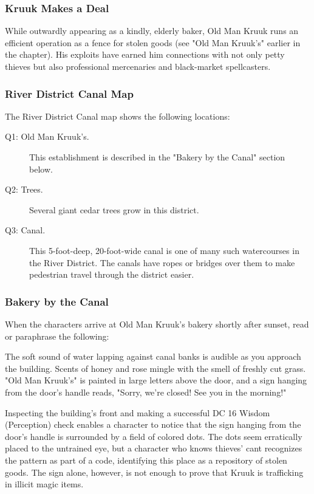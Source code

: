 \documentclass[a4paper, 11pt, bg=full, twocolumn, nooutline]{dndbook}
\begin{document}
\subsubsection{Kruuk Makes a Deal}

While outwardly appearing as a kindly, elderly baker, Old Man Kruuk runs an efficient operation as a fence for stolen goods (see "Old Man Kruuk's" earlier in the chapter). His exploits have earned him connections with not only petty thieves but also professional mercenaries and black-market spellcasters.

\subsubsection{River District Canal Map}

The River District Canal map shows the following locations:

\begin{description}
\item[Q1: Old Man Kruuk's.] This establishment is described in the "Bakery by the Canal" section below.
\item[Q2: Trees.] Several giant cedar trees grow in this district.
\item[Q3: Canal.] This 5-foot-deep, 20-foot-wide canal is one of many such watercourses in the River District. The canals have ropes or bridges over them to make pedestrian travel through the district easier.
\end{description}



\subsubsection{Bakery by the Canal}

When the characters arrive at Old Man Kruuk's bakery shortly after sunset, read or paraphrase the following:

\begin{DndReadAloud}
The soft sound of water lapping against canal banks is audible as you approach the building. Scents of honey and rose mingle with the smell of freshly cut grass. "Old Man Kruuk's" is painted in large letters above the door, and a sign hanging from the door's handle reads, "Sorry, we're closed! See you in the morning!"
\end{DndReadAloud}

Inspecting the building's front and making a successful DC 16 Wisdom (Perception) check enables a character to notice that the sign hanging from the door's handle is surrounded by a field of colored dots. The dots seem erratically placed to the untrained eye, but a character who knows thieves' cant recognizes the pattern as part of a code, identifying this place as a repository of stolen goods. The sign alone, however, is not enough to prove that Kruuk is trafficking in illicit magic items.
\end{document}
